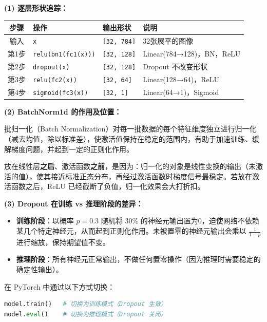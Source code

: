 \documentclass[a4paper,11pt]{ctexart}
\begin{document}
\begin{solutionbox}[参考答案与详细解析]
    \textbf{(1) 逐层形状追踪：}

    \begin{center}
    \begin{tabular}{clll}
        \toprule
        步骤 & 操作 & 输出形状 & 说明 \\
        \midrule
        输入 & \texttt{x} & \texttt{[32, 784]} & 32张展平的图像 \\
        第1步 & \texttt{relu(bn1(fc1(x)))} & \texttt{[32, 128]} & Linear(784→128)，BN，ReLU \\
        第2步 & \texttt{dropout(x)} & \texttt{[32, 128]} & Dropout 不改变形状 \\
        第3步 & \texttt{relu(fc2(x))} & \texttt{[32, 64]} & Linear(128→64)，ReLU \\
        第4步 & \texttt{sigmoid(fc3(x))} & \texttt{[32, 1]} & Linear(64→1)，Sigmoid \\
        \bottomrule
    \end{tabular}
    \end{center}

    \textbf{(2) BatchNorm1d 的作用及位置：}

    批归一化（Batch Normalization）对每一批数据的每个特征维度独立进行归一化（减去均值，除以标准差），使激活值保持在稳定的范围内，有助于加速训练、缓解梯度问题，并起到一定的正则化作用。

    放在线性层\textbf{之后}、激活函数\textbf{之前}，是因为：归一化的对象是线性变换的输出（未激活的值），使其接近标准正态分布，再经过激活函数时梯度信号最稳定。若放在激活函数之后，ReLU 已经截断了负值，归一化效果会大打折扣。

    \textbf{(3) Dropout 在训练 vs 推理阶段的差异：}

    \begin{itemize}
        \item \textbf{训练阶段}：以概率 $p=0.3$ 随机将 30\% 的神经元输出置为0，迫使网络不依赖某几个特定神经元，从而起到正则化作用。未被置零的神经元输出会乘以 $\frac{1}{1-p}$ 进行缩放，保持期望值不变。
        \item \textbf{推理阶段}：所有神经元正常输出，不做任何置零操作（因为推理时需要稳定的确定性输出）。
    \end{itemize}

    在 PyTorch 中通过以下方式切换：
    \begin{lstlisting}[language=Python]
model.train()   # 切换为训练模式（Dropout 生效）
model.eval()    # 切换为推理模式（Dropout 关闭）
    \end{lstlisting}


\end{solutionbox}
\end{document}
